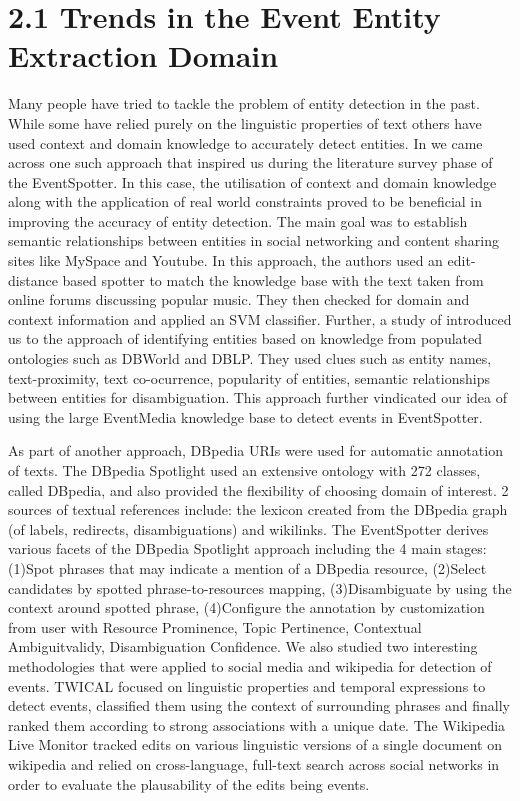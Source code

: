 \documentclass[a4paper,11pt]{report}
\begin{document}
\section*{2.1 Trends in the Event Entity Extraction Domain}
Many people have tried to tackle the problem of entity detection in the past. While some have relied purely on the linguistic properties of text others have used context and domain knowledge to accurately detect entities. In \cite{Gruhl_contextand} we came across one such approach that inspired us during the literature survey phase of the EventSpotter. In this case, the utilisation of context and domain knowledge along with the application of real world constraints proved to be beneficial in improving the accuracy of entity detection. The main goal was to establish semantic relationships between entities in social networking and content sharing sites like MySpace and Youtube. In this approach, the authors used an edit-distance based spotter to match the knowledge base with the text taken from online forums discussing popular music. They then checked for domain and context information and applied an SVM classifier. Further, a study of \cite{Hassell06ontology-drivenautomatic} introduced us to the approach of identifying entities based on knowledge from populated ontologies such as DBWorld and DBLP. They used clues such as entity names, text-proximity, text co-ocurrence, popularity of entities, semantic relationships between entities for disambiguation. This approach further vindicated our idea of using the large EventMedia knowledge base to detect events in EventSpotter.\newline

As part of another approach, DBpedia URIs were used for automatic annotation of texts. The DBpedia Spotlight \cite{Mendes11dbpediaspotlight:} used an extensive ontology with 272 classes, called DBpedia, and also provided the flexibility of choosing domain of interest. 2 sources of textual references include: the lexicon created from the DBpedia graph (of labels, redirects, disambiguations) and wikilinks. The EventSpotter derives various facets of the DBpedia Spotlight approach including the 4 main stages: (1)Spot phrases that may indicate a mention of a DBpedia resource, (2)Select candidates by spotted phrase-to-resources mapping, (3)Disambiguate by using the context around spotted phrase, (4)Configure the annotation by customization from user with Resource Prominence, Topic Pertinence, Contextual Ambiguitvalidy, Disambiguation Confidence. We also studied two interesting methodologies that were applied to social media and wikipedia for detection of events. TWICAL \cite{Ritter_opendomain} focused on linguistic properties and temporal expressions to detect events, classified them using the context of surrounding phrases and finally ranked them according to strong associations with a unique date. The Wikipedia Live Monitor\cite{DBLP:journals/corr/abs-1303-4702} tracked edits on various linguistic versions of a single document on wikipedia and relied on cross-language, full-text search across social networks in order to evaluate the \cite{Hassell06ontology-drivenautomatic} plausability of the edits being events. \newline
\end{document}
